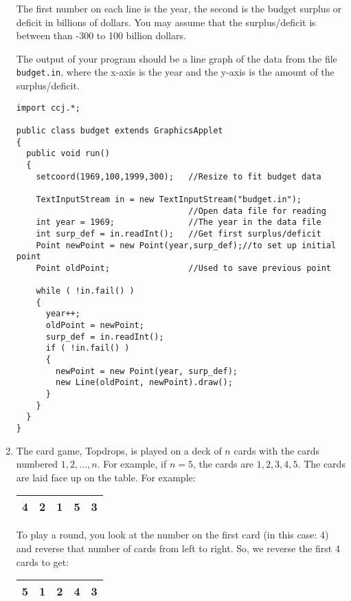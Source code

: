 \begin{enumerate}
	   The first number on each line is the year, the second is the 
           budget surplus or deficit in billions of dollars.  You may 
           assume that the surplus/deficit is between than -300 to 100
           billion dollars.

           The output of your program should be a line graph of 
           the data from 
           the file {\tt budget.in}, where the x-axis is the year and
           the y-axis is the amount of the surplus/deficit. 

\begin{verbatim}
import ccj.*;

public class budget extends GraphicsApplet
{
  public void run()
  {
    setcoord(1969,100,1999,300);   //Resize to fit budget data
    
    TextInputStream in = new TextInputStream("budget.in");
                                   //Open data file for reading
    int year = 1969;               //The year in the data file
    int surp_def = in.readInt();   //Get first surplus/deficit
    Point newPoint = new Point(year,surp_def);//to set up initial point
    Point oldPoint;                //Used to save previous point
    
    while ( !in.fail() )
    {
      year++;            
      oldPoint = newPoint;
      surp_def = in.readInt();
      if ( !in.fail() )
      {
        newPoint = new Point(year, surp_def);
        new Line(oldPoint, newPoint).draw();
      }
    }
  }
}
\end{verbatim}          

        \item The card game, Topdrops, is played on a deck of $n$
           cards with the cards numbered $1,2,\ldots,n$.  For example,
           if $n=5$, the cards are $1,2,3,4,5$.  The cards are laid
           face up on the table.  For example:
	   \begin{tabular}{|c|c|c|c|c|}
               \hline
               4&2&1&5&3\\
               \hline
           \end{tabular}

	   To play a round, you look at the number on the first card 
           (in this case: 4) and reverse that number of cards from
           left to right.  So, we reverse the first 4 cards to get:
	   \begin{tabular}{|c|c|c|c|c|}
               \hline
               5&1&2&4&3\\
               \hline
           \end{tabular}


\end{enumerate}

